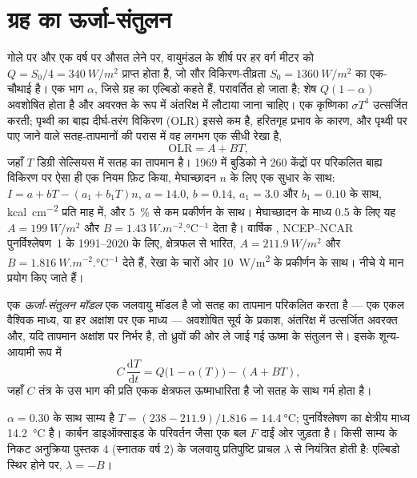 \section{ग्रह का ऊर्जा-संतुलन}\label{sec:b3:climate-models:zero-d}

गोले पर और एक वर्ष पर औसत लेने पर, वायुमंडल के शीर्ष पर हर वर्ग मीटर को
$Q = S_0/4 = \qty{340}{W/m^2}$ प्राप्त होता है, जो
सौर विकिरण-तीव्रता $S_0 = \qty{1360}{W/m^2}$ का एक-चौथाई है। एक भाग $\alpha$, जिसे
ग्रह का एल्बिडो कहते हैं, परावर्तित हो जाता है; शेष $Q(1 - \alpha)$ अवशोषित होता है
और अवरक्त के रूप में अंतरिक्ष में लौटाया जाना चाहिए। एक कृष्णिका $\sigma
T^4$ उत्सर्जित करती; पृथ्वी का बाह्य दीर्घ-तरंग विकिरण (OLR) इससे कम है,
हरितगृह प्रभाव के कारण, और पृथ्वी पर पाए जाने वाले सतह-तापमानों की परास में
वह लगभग एक सीधी रेखा है,
\[
\text{OLR} = A + BT ,
\]
जहाँ $T$ डिग्री सेल्सियस में सतह का तापमान है। 1969 में बुडिको ने
260 केंद्रों पर परिकलित बाह्य विकिरण पर ऐसा ही एक नियम फ़िट किया, मेघाच्छादन
$n$ के लिए एक सुधार के साथ: $I = a + bT - (a_1 + b_1T)n$, $a = 14.0$, $b = 0.14$, $a_1 =
3.0$ और $b_1 = 0.10$ के साथ, \unit{kcal.cm^{-2}} प्रति माह में, और
\qty{5}{\percent} से कम प्रकीर्णन के साथ। मेघाच्छादन के माध्य 0.5 के लिए यह $A =
\qty{199}{W/m^2}$ और $B = \qty{1.43}{W.m^{-2}.\celsius^{-1}}$ देता है। वार्षिक
, NCEP--NCAR पुनर्विश्लेषण~1 के 1991--2020 के लिए, क्षेत्रफल से भारित,
$A = \qty{211.9}{W/m^2}$ और $B = \qty{1.816}{W.m^{-2}.\celsius^{-1}}$ देते हैं,
रेखा के चारों ओर \qty{10}{W/m^2} के प्रकीर्णन के साथ। नीचे ये मान
प्रयोग किए जाते हैं।

\begin{definition}[ऊर्जा-संतुलन मॉडल]\label{def:b3:climate-models:ebm}
एक \emph{ऊर्जा-संतुलन मॉडल} एक जलवायु मॉडल है जो सतह
का तापमान परिकलित करता है --- एक एकल वैश्विक माध्य, या हर अक्षांश पर एक माध्य ---
अवशोषित सूर्य के प्रकाश, अंतरिक्ष में उत्सर्जित अवरक्त
और, यदि तापमान अक्षांश पर निर्भर है, तो
ध्रुवों की ओर ले जाई गई ऊष्मा के संतुलन से। इसके शून्य-आयामी रूप में
\[
C\,\frac{\mathrm dT}{\mathrm dt} = Q\big(1 - \alpha(T)\big) - (A + BT) ,
\]
जहाँ $C$ तंत्र के उस भाग की प्रति एकक क्षेत्रफल ऊष्माधारिता है जो
सतह के साथ गर्म होता है।
\end{definition}

$\alpha = 0.30$ के साथ साम्य है $T = (238 - 211.9)/1.816 =
\qty{14.4}{\celsius}$; पुनर्विश्लेषण का क्षेत्रीय माध्य
\qty{14.2}{\celsius} है। कार्बन डाइऑक्साइड के परिवर्तन जैसा एक बल $F$
दाईं ओर जुड़ता है। किसी साम्य के निकट अनुक्रिया
पुस्तक 4 (स्नातक वर्ष 2) के जलवायु प्रतिपुष्टि प्राचल $\lambda$ से नियंत्रित होती है:
एल्बिडो स्थिर होने पर, $\lambda = -B$।

